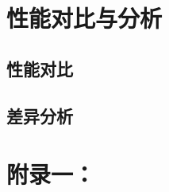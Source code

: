 \documentclass[10pt,a4paper,twoside]{article}
\numberwithin{figure}{section}%
\numberwithin{table}{section}%
\begin{document}
\section{性能对比与分析}

\subsection{性能对比}

\subsection{差异分析}













\newpage
\appendix%
\section*{附录一：}
\end{document}
